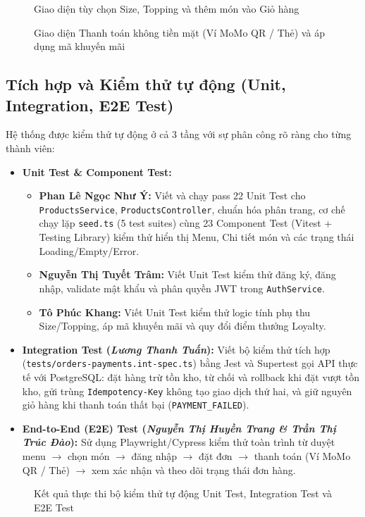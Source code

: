 \begin{figure}[H]
\centering
{}
\caption{Giao diện tùy chọn Size, Topping và thêm món vào Giỏ hàng}
\end{figure}

\begin{figure}[H]
\centering
{}
\caption{Giao diện Thanh toán không tiền mặt (Ví MoMo QR / Thẻ) và áp dụng mã khuyến mãi}
\end{figure}

\subsection{Tích hợp và Kiểm thử tự động (Unit, Integration, E2E Test)}
Hệ thống được kiểm thử tự động ở cả 3 tầng với sự phân công rõ ràng cho từng thành viên:
\begin{itemize}
    \item \textbf{Unit Test \& Component Test:}
    \begin{itemize}
        \item \textbf{Phan Lê Ngọc Như Ý:} Viết và chạy pass 22 Unit Test cho \texttt{ProductsService}, \texttt{ProductsController}, chuẩn hóa phân trang, cơ chế chạy lặp \texttt{seed.ts} (5 test suites) cùng 23 Component Test (Vitest + Testing Library) kiểm thử hiển thị Menu, Chi tiết món và các trạng thái Loading/Empty/Error.
        \item \textbf{Nguyễn Thị Tuyết Trâm:} Viết Unit Test kiểm thử đăng ký, đăng nhập, validate mật khẩu và phân quyền JWT trong \texttt{AuthService}.
        \item \textbf{Tô Phúc Khang:} Viết Unit Test kiểm thử logic tính phụ thu Size/Topping, áp mã khuyến mãi và quy đổi điểm thưởng Loyalty.
    \end{itemize}
    \item \textbf{Integration Test (\textit{Lương Thanh Tuấn}):} Viết bộ kiểm thử tích hợp (\texttt{tests/orders-payments.int-spec.ts}) bằng Jest và Supertest gọi API thực tế với PostgreSQL: đặt hàng trừ tồn kho, từ chối và rollback khi đặt vượt tồn kho, gửi trùng \texttt{Idempotency-Key} không tạo giao dịch thứ hai, và giữ nguyên giỏ hàng khi thanh toán thất bại (\texttt{PAYMENT\_FAILED}).
    \item \textbf{End-to-End (E2E) Test (\textit{Nguyễn Thị Huyền Trang \& Trần Thị Trúc Đào}):} Sử dụng Playwright/Cypress kiểm thử toàn trình từ duyệt menu $\rightarrow$ chọn món $\rightarrow$ đăng nhập $\rightarrow$ đặt đơn $\rightarrow$ thanh toán (Ví MoMo QR / Thẻ) $\rightarrow$ xem xác nhận và theo dõi trạng thái đơn hàng.
\end{itemize}

\begin{figure}[H]
\centering
{}
\caption{Kết quả thực thi bộ kiểm thử tự động Unit Test, Integration Test và E2E Test}
\end{figure}